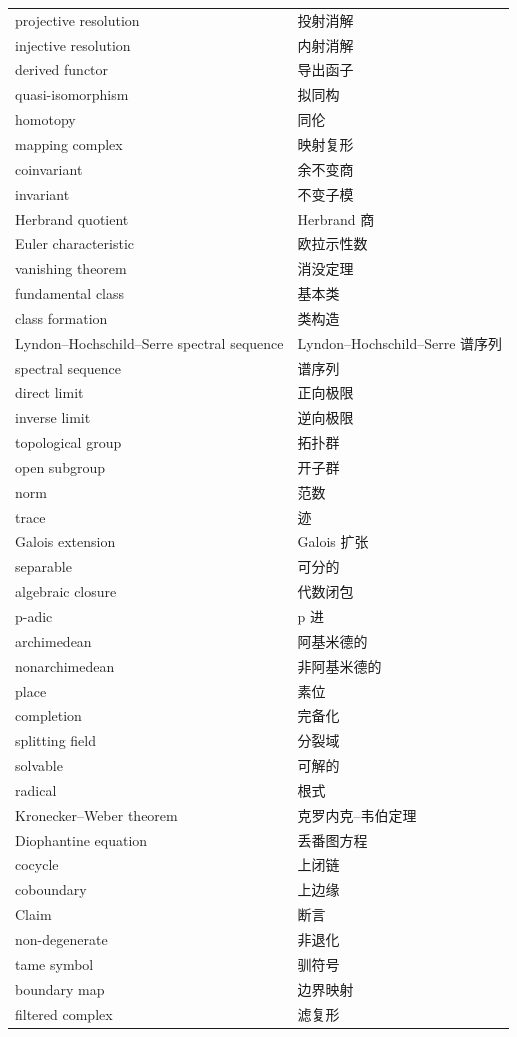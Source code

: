 \begin{longtable}{p{}p{}}
projective resolution & 投射消解 \\
injective resolution & 内射消解 \\
derived functor & 导出函子 \\
quasi-isomorphism & 拟同构 \\
homotopy & 同伦 \\
mapping complex & 映射复形 \\
coinvariant & 余不变商 \\
invariant & 不变子模 \\
Herbrand quotient & Herbrand 商 \\
Euler characteristic & 欧拉示性数 \\
vanishing theorem & 消没定理 \\
fundamental class & 基本类 \\
class formation & 类构造 \\
Lyndon–Hochschild–Serre spectral sequence & Lyndon–Hochschild–Serre 谱序列 \\
spectral sequence & 谱序列 \\
direct limit & 正向极限 \\
inverse limit & 逆向极限 \\
topological group & 拓扑群 \\
open subgroup & 开子群 \\
norm & 范数 \\
trace & 迹 \\
Galois extension & Galois 扩张 \\
separable & 可分的 \\
algebraic closure & 代数闭包 \\
p-adic & p 进 \\
archimedean & 阿基米德的 \\
nonarchimedean & 非阿基米德的 \\
place & 素位 \\
completion & 完备化 \\
splitting field & 分裂域 \\
solvable & 可解的 \\
radical & 根式 \\
Kronecker–Weber theorem & 克罗内克–韦伯定理 \\
Diophantine equation & 丢番图方程 \\
cocycle & 上闭链 \\
coboundary & 上边缘 \\
Claim & 断言 \\
non-degenerate & 非退化 \\
tame symbol & 驯符号 \\
boundary map & 边界映射 \\
filtered complex & 滤复形 \\
\bottomrule
\end{longtable}
